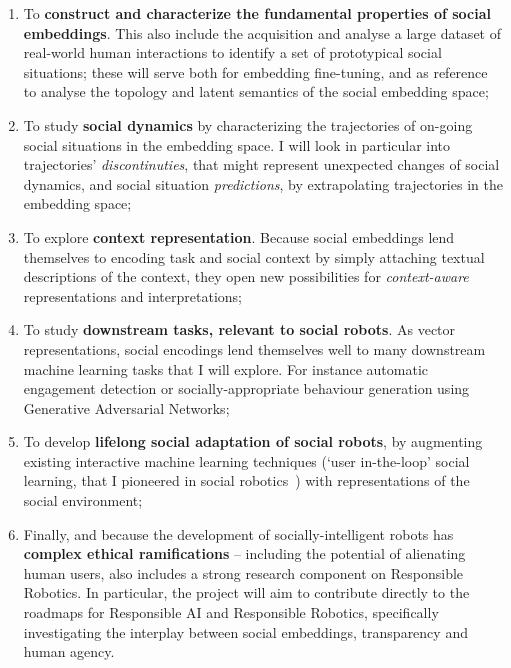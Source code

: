 
\begin{enumerate}[label=\textbf{O\arabic*}]
    \item \label{T1} To \textbf{construct and characterize the fundamental
        properties of social embeddings}. This also include the acquisition and
        analyse a large dataset of real-world human interactions to identify a
        set of prototypical social situations; these will serve both for
        embedding fine-tuning, and as reference to analyse the topology and
        latent semantics of the social embedding space;

    \item \label{T2} To study \textbf{social dynamics} by characterizing the
        trajectories of on-going social situations in the embedding space. I
        will look in particular into trajectories' \emph{discontinuties}, that
        might represent unexpected changes of social dynamics, and social
        situation \emph{predictions}, by extrapolating trajectories in the embedding
        space;

    \item \label{T5} To explore \textbf{context representation}. Because social
        embeddings lend themselves to encoding task and social context by
        simply attaching textual descriptions of the context, they open new
        possibilities for \emph{context-aware} representations and
        interpretations;

    \item \label{T3} To study \textbf{downstream tasks, relevant to social
        robots}. As vector representations, social encodings lend themselves
        well to many downstream machine learning tasks that I will explore. For
        instance automatic engagement detection or socially-appropriate
        behaviour generation using Generative Adversarial Networks;

    \item \label{T4} To develop \textbf{lifelong social adaptation of social
        robots}, by augmenting existing interactive machine learning techniques
        (`user in-the-loop' social learning, that I pioneered in social
        robotics~\cite{senft2017supervised, winkle2020couch,winkle2021leador})
        with representations of the social environment;

    \item \label{T6} Finally, and because the development of
        socially-intelligent robots has \textbf{complex ethical ramifications}
        -- including the potential of alienating human users, \project also
        includes a strong research component on Responsible Robotics. In
        particular, the project will aim to contribute directly to the roadmaps
        for Responsible AI and Responsible Robotics, specifically investigating
        the interplay between social embeddings, transparency and human agency.

\end{enumerate}

